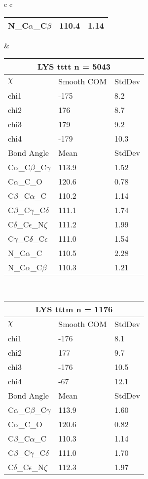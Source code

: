 \begin{longtable}{ c c }
\begin{tabular}{ l l l }
  N\_C$\alpha$\_C$\beta$ & 110.4 & 1.14\\
  \bottomrule
  \end{tabular}
  &
  \begin{tabular}{ l l l }
  \toprule
  \multicolumn{3}{c}{LYS \textbf{tttt} n = 5043} \\ \toprule
  $\chi$       & Smooth COM & StdDev \\ \midrule
  chi1 & -175 & 8.2 \\ 
  chi2 & 176 & 8.7 \\ 
  chi3 & 179 & 9.2 \\ 
  chi4 & -179 & 10.3 \\ \midrule
  Bond Angle   & Mean     & StdDev \\ \midrule
  C$\alpha$\_C$\beta$\_C$\gamma$ & 113.9 & 1.52\\
  C$\alpha$\_C\_O & 120.6 & 0.78\\
  C$\beta$\_C$\alpha$\_C & 110.2 & 1.14\\
  C$\beta$\_C$\gamma$\_C$\delta$ & 111.1 & 1.74\\
  C$\delta$\_C$\epsilon$\_N$\zeta$ & 111.2 & 1.99\\
  C$\gamma$\_C$\delta$\_C$\epsilon$ & 111.0 & 1.54\\
  N\_C$\alpha$\_C & 110.5 & 2.28\\
  N\_C$\alpha$\_C$\beta$ & 110.3 & 1.21\\
  \bottomrule
  \end{tabular}
  \\
  \begin{tabular}{ l l l }
  \toprule
  \multicolumn{3}{c}{LYS \textbf{tttm} n = 1176} \\ \toprule
  $\chi$       & Smooth COM & StdDev \\ \midrule
  chi1 & -176 & 8.1 \\ 
  chi2 & 177 & 9.7 \\ 
  chi3 & -176 & 10.5 \\ 
  chi4 & -67 & 12.1 \\ \midrule
  Bond Angle   & Mean     & StdDev \\ \midrule
  C$\alpha$\_C$\beta$\_C$\gamma$ & 113.9 & 1.60\\
  C$\alpha$\_C\_O & 120.6 & 0.82\\
  C$\beta$\_C$\alpha$\_C & 110.3 & 1.14\\
  C$\beta$\_C$\gamma$\_C$\delta$ & 111.0 & 1.70\\
  C$\delta$\_C$\epsilon$\_N$\zeta$ & 112.3 & 1.97\\

\end{tabular}
\end{longtable}
